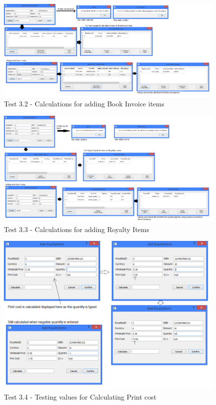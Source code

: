 \begin{landscape}
\begin{figure}[H]
    \includegraphics[width=\textwidth]{./Testing/Evidence/Series3/AddInvoiceItemTest.png}
    \caption{Test 3.2 - Calculations for adding Book Invoice items}  \label{fig:AddInvoiceItemTest}
\end{figure}

\begin{figure}[H]
    \includegraphics[width=\textwidth]{./Testing/Evidence/Series3/AddRoyaltyItemTest.png}
    \caption{Test 3.3 - Calculations for adding Royalty Items}  \label{fig:AddRoyaltyItemTest}
\end{figure}

\begin{figure}[H]
    \includegraphics[width=\textwidth]{./Testing/Evidence/Series3/PrintCostValidation.png}
    \caption{Test 3.4 - Testing values for Calculating Print cost}  \label{fig:PrintCostValidation}
\end{figure}


\end{landscape}
